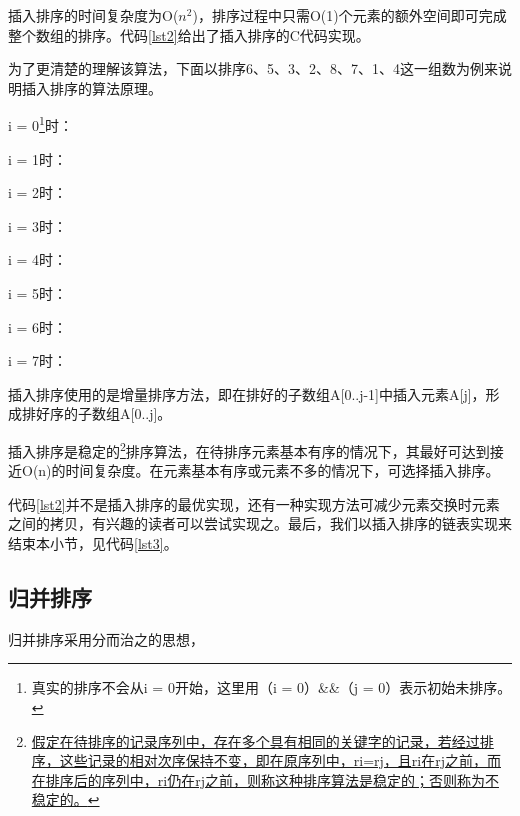 \documentclass[a4paper, 12pt, titlepage]{article}
\newlength{\du}
\begin{document}
插入排序的时间复杂度为O(${n}^{2}$)，排序过程中只需O(1)个元素的额外空间即可完成整个数组的排序。代码\ref{lst2}给出了插入排序的C代码实现。
\begin{spacing}{1.0}
  
\end{spacing}


为了更清楚的理解该算法，下面以排序6、5、3、2、8、7、1、4这一组数为例来说明插入排序的算法原理。

\captionsetup[figure]{labelformat=empty}

i = 0\footnote{真实的排序不会从i = 0开始，这里用（i = 0）\&\&（j = 0）表示初始未排序。}时：


i = 1时：


i = 2时：


i = 3时：


i = 4时：


i = 5时：


i = 6时：


i = 7时：


插入排序使用的是增量排序方法，即在排好的子数组A[0..j-1]中插入元素A[j]，形成排好序的子数组A[0..j]。

插入排序是稳定的\footnote{\href{http://baike.baidu.com/view/547325.htm?fr=aladdin}{假定在待排序的记录序列中，存在多个具有相同的关键字的记录，若经过排序，这些记录的相对次序保持不变，即在原序列中，ri=rj，且ri在rj之前，而在排序后的序列中，ri仍在rj之前，则称这种排序算法是稳定的；否则称为不稳定的。}}排序算法，在待排序元素基本有序的情况下，其最好可达到接近O(n)的时间复杂度。在元素基本有序或元素不多的情况下，可选择插入排序。

代码\ref{lst2}并不是插入排序的最优实现，还有一种实现方法可减少元素交换时元素之间的拷贝，有兴趣的读者可以尝试实现之。最后，我们以插入排序的链表实现来结束本小节，见代码\ref{lst3}。
\begin{spacing}{1.0}
  
\end{spacing}

\subsection{归并排序}
\label{subsec:merge_sort}
归并排序采用分而治之的思想，


\end{document}
